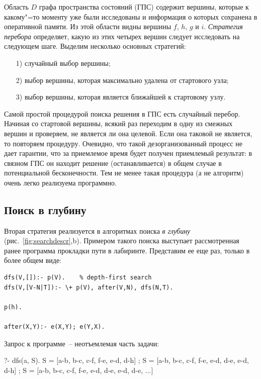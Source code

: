 \documentclass[a4paper,14pt, openany, twoside, draft]{extbook} %
\begin{document}
Область $D$ графа пространства состояний (ГПС) содержит вершины, которые к какому"=то моменту уже были исследованы и информация о которых сохранена в оперативной памяти.  Из этой области видны вершины $f$, $h$, $g$ и $i$.  \emph{Стратегия перебора} определяет, какую из этих четырех вершин следует исследовать на следующем шаге.  Выделим несколько основных стратегий:
\begin{enumerate}
\item[1)] случайный выбор вершины;
\item[2)] выбор вершины, которая максимально удалена от стартового узла;
\item[3)] выбор вершины, которая является ближайшей к стартовому узлу.
\end{enumerate}

Самой простой процедурой поиска решения в ГПС есть случайный перебор.  Начиная со стартовой вершины, всякий раз переходим в одну из смежных вершин и проверяем, не является ли она целевой.  Если она таковой не является, то повторяем процедуру.  Очевидно, что такой дезорганизованный процесс не дает гарантии, что за приемлемое время будет получен приемлемый результат: в связном ГПС он находит решение (останавливается) в общем случае в потенциальной бесконечности.  Тем не менее такая процедура (а не алгоритм) очень легко реализуема программно.

\subsection{Поиск в глубину}
\label{sec:depthfirst}

Вторая стратегия реализуется в алгоритмах поиска \emph{в глубину} (рис.~\ref{fig:searchdescr},b).  Примером такого поиска выступает рассмотренная ранее программа прокладки пути в лабиринте.  Представим ее еще раз, только в более общем виде:

\begin{verbatim}
dfs(V,[]):- p(V).    % depth-first search
dfs(V,[V-N|T]):- \+ p(V), after(V,N), dfs(N,T).

p(h).

after(X,Y):- e(X,Y); e(Y,X).
\end{verbatim}

\noindent{}Запрос к программе~-- неотъемлемая часть задачи:

\begin{proexp}
?- dfs(a, S).
S = [a-b, b-c, c-f, f-e, e-d, d-h] ;
S = [a-b, b-c, c-f, f-e, e-d, d-e, e-d, d-h] ;
S = [a-b, b-c, c-f, f-e, e-d, d-e, e-d, d-e, ...]
\end{proexp}
\end{document}
